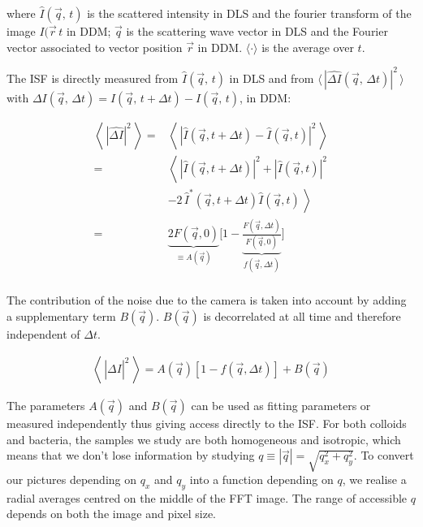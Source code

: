 \documentclass[%
 aip,
 jmp,%
 amsmath,amssymb,
reprint,%
]{revtex4-1}
\begin{document}
where $\hat{I}(\vec{q}, \, t)$ is the scattered intensity in DLS and the fourier transform of the image ${I(\vec{r} \, t}$ in DDM; $\vec{q}$ is the scattering wave vector in DLS and the Fourier vector associated to vector position $\vec{r}$ in DDM. $\langle \cdot \rangle$ is the average over $t$.

The ISF  is directly measured from $\hat{I}(\vec{q}, \, t)$ in DLS and from $\langle \, | \widehat{\Delta I}(\vec{q},\,\Delta t)|^2 \, \rangle$ with $\Delta I(\vec{q},\,\Delta t) = I(\vec{q},\, t+\Delta t) - I(\vec{q},\, t)$, in DDM:

\begin{align*}
\left\langle \, \left|\widehat{\Delta I}\right|^2 \, \right\rangle =& \left\langle \, \left|\widehat{I}(\vec{q},t+\Delta t) - \widehat{I}(\vec{q},t)\right|^2 \, \right\rangle \\
=& \left\langle \, \left|\widehat{I}(\vec{q},t+ \Delta t)\right|^2 + \left|\widehat{I}(\vec{q},t)\right|^2\right. \\
&\left.- 2 \, \widehat{I}^*(\vec{q},t+\Delta t) \widehat{I}(\vec{q},t) \, \right\rangle\\
=& \underbrace{2F(\vec{q}, 0)}_{\equiv A(\vec{q})} \bigg[ 1-\underbrace{\frac{F(\vec{q}, \Delta t)}{F(\vec{q}, 0)}}_{f(\vec{q}, \Delta t)} \bigg]\\
\end{align*}

The contribution of the noise due to the camera is taken into account by adding a supplementary term $B(\vec{q})$. $B(\vec{q})$ is decorrelated  at all time and therefore independent of $\Delta t$.

\begin{eqnarray}
\left\langle \, \left|\widehat{\Delta I}\right|^2 \, \right\rangle = A(\vec{q})\left[1-f(\vec{q}, \Delta t)\right] + B(\vec{q})
\end{eqnarray}

The parameters $A(\vec{q})$ and $B(\vec{q})$ can be used as fitting parameters or measured independently thus giving access directly to the ISF. For both colloids and bacteria, the samples we study are both homogeneous and isotropic, which means that we don't lose information by studying $q \equiv |\vec{q}| = \sqrt{q_x^2 + q_y ^2}$. To convert our pictures depending on $q_x$ and $q_y$ into a function depending on $q$, we realise a radial averages centred on the middle of the FFT image. The range of accessible $q$ depends on both the image and pixel size.
\end{document}
